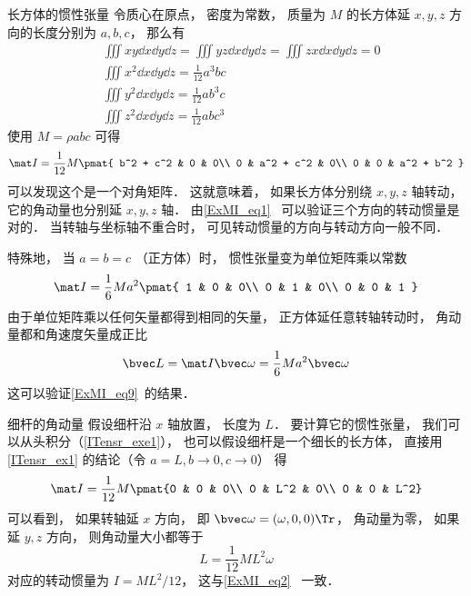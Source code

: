 \begin{example}{长方体的惯性张量}\label{ITensr_ex1}
令质心在原点， 密度为常数， 质量为 $M$ 的长方体延 $x, y, z$ 方向的长度分别为 $a, b, c$， 那么有
\begin{equation}
\begin{aligned}
&\iiint xy \dd{x}\dd{y}\dd{z} = \iiint yz \dd{x}\dd{y}\dd{z} = \iiint zx \dd{x}\dd{y}\dd{z} = 0\\
&\iiint x^2 \dd{x}\dd{y}\dd{z} = \frac{1}{12} a^3 bc\\
&\iiint y^2 \dd{x}\dd{y}\dd{z} = \frac{1}{12} ab^3 c\\
&\iiint z^2 \dd{x}\dd{y}\dd{z} = \frac{1}{12} ab c^3
\end{aligned}
\end{equation}
使用 $M = \rho abc$ 可得
\begin{equation}\label{ITensr_eq4}
\mat I = \frac{1}{12} M
\pmat{
   b^2 + c^2 & 0 & 0\\
   0 & a^2 + c^2 & 0\\
   0 & 0 & a^2 + b^2
}
\end{equation}
可以发现这个是一个对角矩阵． 这就意味着， 如果长方体分别绕 $x, y, z$ 轴转动， 它的角动量也分别延 $x, y, z$ 轴． 由\autoref{ExMI_eq1}~ 可以验证三个方向的转动惯量是对的． 当转轴与坐标轴不重合时， 可见转动惯量的方向与转动方向一般不同．

特殊地， 当 $a = b = c$ （正方体）时， 惯性张量变为单位矩阵乘以常数
\begin{equation}
\mat I = \frac{1}{6} Ma^2
\pmat{
   1 & 0 & 0\\
   0 & 1 & 0\\
   0 & 0 & 1
}
\end{equation}
由于单位矩阵乘以任何矢量都得到相同的矢量， 正方体延任意转轴转动时， 角动量都和角速度矢量成正比
\begin{equation}
\bvec L = \mat I \bvec \omega = \frac{1}{6} Ma^2 \bvec \omega
\end{equation}
这可以验证\autoref{ExMI_eq9}~的结果．
\end{example}

\begin{example}{细杆的角动量}
假设细杆沿 $x$ 轴放置， 长度为 $L$． 要计算它的惯性张量， 我们可以从头积分（\autoref{ITensr_exe1}）， 也可以假设细杆是一个细长的长方体， 直接用\autoref{ITensr_ex1} 的结论（令 $a = L, b \to 0, c \to 0$） 得
\begin{equation}\label{ITensr_eq5}
\mat I = \frac{1}{12} M \pmat{0 & 0 & 0\\ 0 & L^2 & 0\\ 0 & 0 & L^2}
\end{equation}
可以看到， 如果转轴延 $x$ 方向， 即 $\bvec\omega = (\omega, 0, 0)\Tr$， 角动量为零， 如果延 $y, z$ 方向， 则角动量大小都等于
\begin{equation}
L = \frac{1}{12} M L^2 \omega
\end{equation}
对应的转动惯量为 $I = ML^2/12$， 这与\autoref{ExMI_eq2}~ 一致．
\end{example}

